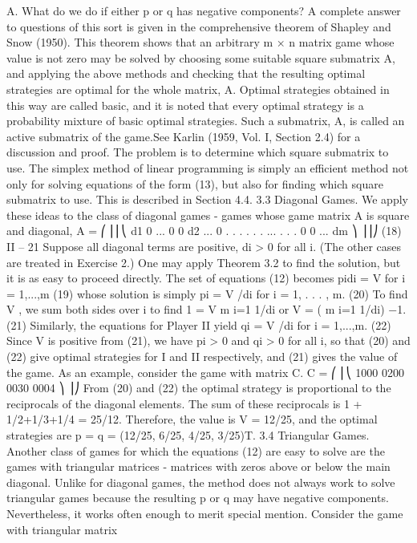 A.
What do we do if either p or q has negative components? A complete answer to
questions of this sort is given in the comprehensive theorem of Shapley and Snow (1950).
This theorem shows that an arbitrary m × n matrix game whose value is not zero may be
solved by choosing some suitable square submatrix A, and applying the above methods
and checking that the resulting optimal strategies are optimal for the whole matrix, A.
Optimal strategies obtained in this way are called basic, and it is noted that every optimal
strategy is a probability mixture of basic optimal strategies. Such a submatrix, A, is called
an active submatrix of the game.See Karlin (1959, Vol. I, Section 2.4) for a discussion and
proof. The problem is to determine which square submatrix to use. The simplex method
of linear programming is simply an efficient method not only for solving equations of the
form (13), but also for finding which square submatrix to use. This is described in Section
4.4.
3.3 Diagonal Games. We apply these ideas to the class of diagonal games - games
whose game matrix A is square and diagonal,
A =
⎛
⎜⎜⎝
d1 0 ... 0
0 d2 ... 0 .
.
. .
.
. ... .
.
.
0 0 ... dm
⎞
⎟⎟⎠
(18)
II – 21
Suppose all diagonal terms are positive, di > 0 for all i. (The other cases are treated in
Exercise 2.) One may apply Theorem 3.2 to find the solution, but it is as easy to proceed
directly. The set of equations (12) becomes
pidi = V for i = 1,...,m (19)
whose solution is simply
pi = V /di for i = 1, . . . , m. (20)
To find V , we sum both sides over i to find
1 = V 
m
i=1
1/di or V = (
m
i=1
1/di)
−1. (21)
Similarly, the equations for Player II yield
qi = V /di for i = 1,...,m. (22)
Since V is positive from (21), we have pi > 0 and qi > 0 for all i, so that (20) and (22)
give optimal strategies for I and II respectively, and (21) gives the value of the game.
As an example, consider the game with matrix C.
C =
⎛
⎜⎝
1000
0200
0030
0004
⎞
⎟⎠
From (20) and (22) the optimal strategy is proportional to the reciprocals of the diagonal
elements. The sum of these reciprocals is 1 + 1/2+1/3+1/4 = 25/12. Therefore, the
value is V = 12/25, and the optimal strategies are p = q = (12/25, 6/25, 4/25, 3/25)T.
3.4 Triangular Games. Another class of games for which the equations (12) are
easy to solve are the games with triangular matrices - matrices with zeros above or below
the main diagonal. Unlike for diagonal games, the method does not always work to solve
triangular games because the resulting p or q may have negative components. Nevertheless,
it works often enough to merit special mention. Consider the game with triangular matrix
